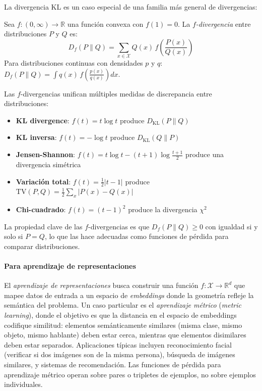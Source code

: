 La divergencia \gls{KL} es un caso especial de una familia más general de divergencias:

\begin{definition}[\(f\)-divergencia]\label{def:f_divergence}
	Sea \(f: (0, \infty) \to \mathbb{R}\) una función convexa con \(f(1) = 0\). La \textit{\(f\)-divergencia} entre distribuciones \(P\) y \(Q\) es:
	\[
		D_f(P \| Q) = \sum_{x \in \mathcal{X}} Q(x) \, f\left(\frac{P(x)}{Q(x)}\right)
	\]
	Para distribuciones continuas con densidades \(p\) y \(q\): \(D_f(P \| Q) = \int q(x) \, f\left(\frac{p(x)}{q(x)}\right) dx\).
\end{definition}

Las \(f\)-divergencias unifican múltiples medidas de discrepancia entre distribuciones:
\begin{itemize}
	\item \textbf{KL divergence}: \(f(t) = t \log t\) produce \(D_{\text{KL}}(P \| Q)\)
	\item \textbf{KL inversa}: \(f(t) = -\log t\) produce \(D_{\text{KL}}(Q \| P)\)
	\item \textbf{Jensen-Shannon}: \(f(t) = t \log t - (t+1) \log \frac{t+1}{2}\) produce una divergencia simétrica
	\item \textbf{Variación total}: \(f(t) = \frac{1}{2}|t - 1|\) produce \(\text{TV}(P, Q) = \frac{1}{2}\sum_x |P(x) - Q(x)|\)
	\item \textbf{Chi-cuadrado}: \(f(t) = (t-1)^2\) produce la divergencia \(\chi^2\)
\end{itemize}

La propiedad clave de las \(f\)-divergencias es que \(D_f(P \| Q) \geq 0\) con igualdad si y solo si \(P = Q\), lo que las hace adecuadas como funciones de pérdida para comparar distribuciones.

\paragraph{Para aprendizaje de representaciones}

El \textit{aprendizaje de representaciones} busca construir una función \(f: \mathcal{X} \to \mathbb{R}^d\) que mapee datos de entrada a un espacio de \textit{embeddings} donde la geometría refleje la semántica del problema. Un caso particular es el \textit{aprendizaje métrico} (\textit{metric learning}), donde el objetivo es que la distancia en el espacio de embeddings codifique similitud: elementos semánticamente similares (misma clase, mismo objeto, mismo hablante) deben estar cerca, mientras que elementos disimilares deben estar separados. Aplicaciones típicas incluyen reconocimiento facial (verificar si dos imágenes son de la misma persona), búsqueda de imágenes similares, y sistemas de recomendación. Las funciones de pérdida para aprendizaje métrico operan sobre pares o tripletes de ejemplos, no sobre ejemplos individuales.

